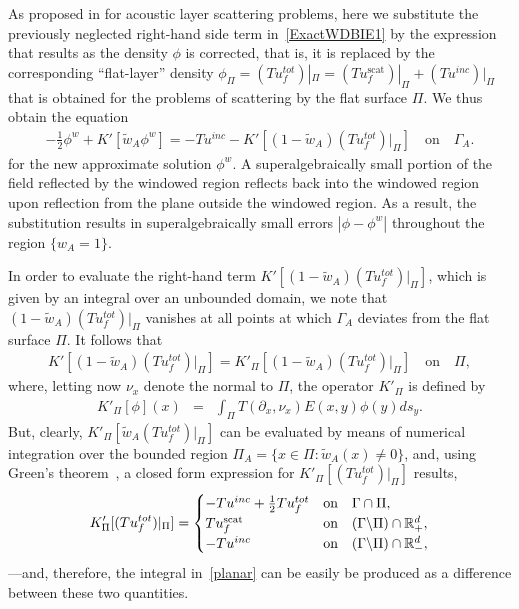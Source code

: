 \documentclass[10pt]{article}
\numberwithin{equation}{section}
\newcommand{\R}{{\mathbb R}}
\newcommand{\be}{\begin{eqnarray}}
\newcommand{\ben}{\begin{eqnarray*}}
\newcommand{\en}{\end{eqnarray}}
\newcommand{\enn}{\end{eqnarray*}}
\newcommand{\pa}{\partial}
\begin{document}
As proposed in \cite{BLPT16,P16} for acoustic layer scattering
problems, here we substitute the previously neglected right-hand side
term in~\eqref{ExactWDBIE1} by the expression that results as the
density $\phi$ is corrected, that is, it is replaced by the
corresponding ``flat-layer'' density
$\phi_\Pi =
(Tu_f^{tot})|_\Pi=(Tu_f^\mathrm{scat})|_\Pi+(Tu^{inc})|_\Pi$ that is
obtained for the problems of scattering by the flat surface $\Pi$. We
thus obtain the equation \be
\label{WDBIE2}
-\frac{1}{2}\phi^w+K'[\widetilde{w}_A\phi^w]=-Tu^{inc}-
K'[(1-\widetilde{w}_A)(Tu_f^{tot})|_\Pi] \quad\mbox{on}\quad\Gamma_A.
\en for the new approximate solution $\phi^w$. A superalgebraically
small portion of the field reflected by the windowed region reflects
back into the windowed region upon reflection from the plane outside
the windowed region. As a result, the substitution results in
superalgebraically small errors $|\phi-\phi^w|$ throughout the region
$\{w_A=1\}$.


In order to evaluate the right-hand term
$K'[(1-\widetilde{w}_A)(Tu_f^{tot})|_\Pi]$, which is given by an
integral over an unbounded domain, we note that
$(1-\widetilde{w}_A)(Tu_f^{tot})|_\Pi$ vanishes at all points at which
$\Gamma_A$ deviates from the flat surface $\Pi$. It follows that \ben
K'[(1-\widetilde{w}_A)(Tu_f^{tot})|_\Pi]=K'_\Pi[(1-\widetilde{w}_A)(Tu_f^{tot})|_\Pi]
\quad\mbox{on}\quad\Pi, \enn where, letting now $\nu_x$ denote the
normal to $\Pi$, the operator $K'_\Pi$ is defined by \be\label{planar}
K'_\Pi[\phi](x)&=&\int_\Pi T(\pa_x,\nu_x)E(x,y)\phi(y)ds_y.  \en But,
clearly, $K'_\Pi[\widetilde{w}_A(Tu_f^{tot})|_\Pi]$ can be evaluated
by means of numerical integration over the bounded region
$\Pi_A=\{x\in\Pi:\widetilde{w}_A(x)\ne 0\}$, and, using Green's
theorem~\cite{CGK02}, a closed form expression for
$K'_\Pi[(Tu_f^{tot})|_\Pi]$ results, \ben
K'_\Pi[(Tu_f^{tot})|_\Pi]=\begin{cases} -Tu^{inc}+
  \frac{1}{2}Tu_f^{tot} & \mbox{on}\quad\Gamma\cap\Pi, \cr
  Tu_f^\mathrm{scat} & \mbox{on}\quad (\Gamma\backslash\Pi)\cap\R^d_+,
  \cr -Tu^{inc} & \mbox{on}\quad (\Gamma\backslash\Pi)\cap\R^d_-,
\end{cases}
\enn ---and, therefore, the integral in~\eqref{planar} can be easily
be produced as a difference between these two quantities.
\end{document}
